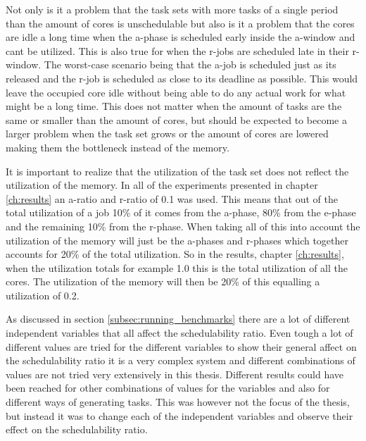 \documentclass{kththesis}
\begin{document}
Not only is it a problem that the task sets with more tasks of a single period than the amount of
cores is unschedulable but also is it a problem that the cores are idle a long time when the
\acrshort{a}-phase is scheduled early inside the \acrshort{a}-window and cant be utilized. This is
also true for when the \acrshort{r}-jobs are scheduled late in their \acrshort{r}-window. The
worst-case scenario being that the \acrshort{a}-job is scheduled just as its released and the
\acrshort{r}-job is scheduled as close to its deadline as possible. This would leave the occupied
core idle without being able to do any actual work for what might be a long time. This does not
matter when the amount of tasks are the same or smaller than the amount of cores, but should be
expected to become a larger problem when the task set grows or the amount of cores are lowered
making them the bottleneck instead of the memory.

It is important to realize that the utilization of the task set does not reflect the utilization of
the memory. In all of the experiments presented in chapter \ref{ch:results} an \acrshort{a}-ratio and
\acrshort{r}-ratio of 0.1 was used. This means that out of the total utilization of a job 10\% of it
comes from the \acrshort{a}-phase, 80\% from the \acrshort{e}-phase and the remaining 10\% from the
\acrshort{r}-phase. When taking all of this into account the utilization of the memory will just be
the \acrshort{a}-phases and \acrshort{r}-phases which together accounts for 20\% of the total
utilization. So in the results, chapter \ref{ch:results}, when the utilization totals for
example 1.0 this is the total utilization of all the cores. The utilization of the memory will then
be 20\% of this equalling a utilization of 0.2.

As discussed in section \ref{subsec:running_benchmarks} there are a lot of different independent
variables that all affect the schedulability ratio. Even tough a lot of different values are tried
for the different variables to show their general affect on the schedulability ratio it is a very
complex system and different combinations of values are not tried very extensively in this thesis.
Different results could  have been reached for other combinations of values for the
variables and also for different ways of generating tasks. This was however not the focus of the
thesis, but instead it was to change each of the independent variables and observe their effect on
the schedulability ratio.
\end{document}
